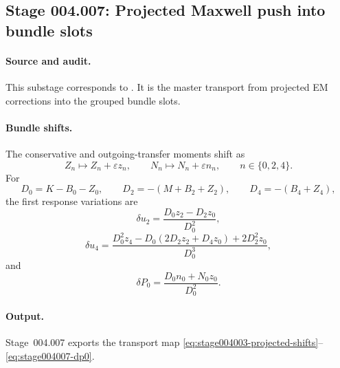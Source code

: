 \subsection*{Stage 004.007: Projected Maxwell push into bundle slots}
\label{subsec:stage004007-projected-maxwell-push-bundle-master}

\paragraph{Source and audit.}
This substage corresponds to
.
It is the master transport from projected EM corrections into the grouped
bundle slots.

\paragraph{Bundle shifts.}
The conservative and outgoing-transfer moments shift as
\begin{equation}
\label{eq:stage004003-projected-shifts}
Z_n\mapsto Z_n+\varepsilon z_n,\qquad
N_n\mapsto N_n+\varepsilon n_n,\qquad n\in\{0,2,4\}.
\end{equation}
For
\[
D_0=K-B_0-Z_0,\qquad D_2=-(M+B_2+Z_2),\qquad D_4=-(B_4+Z_4),
\]
the first response variations are
\begin{equation}
\label{eq:stage004007-du2}
\delta u_2=\frac{D_0z_2-D_2z_0}{D_0^2},
\end{equation}
\begin{equation}
\label{eq:stage004007-du4}
\delta u_4=
\frac{D_0^2z_4-D_0(2D_2z_2+D_4z_0)+2D_2^2z_0}{D_0^3},
\end{equation}
and
\begin{equation}
\label{eq:stage004007-dp0}
\delta P_0=\frac{D_0n_0+N_0z_0}{D_0^2}.
\end{equation}

\paragraph{Output.}
Stage~004.007 exports the transport map
\eqref{eq:stage004003-projected-shifts}--\eqref{eq:stage004007-dp0}.
